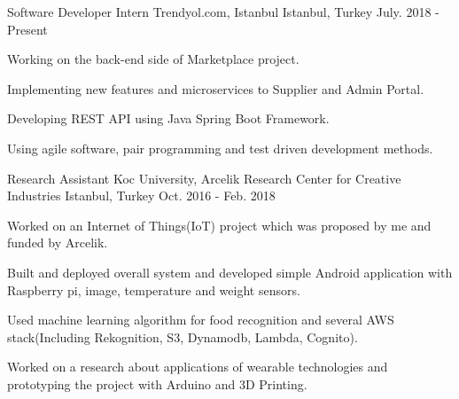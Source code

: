 
\begin{cventries}

  \cventry
   {Software Developer Intern} %
    {Trendyol.com, Istanbul} %
    {Istanbul, Turkey} %
    {July. 2018 - Present} %
    {
      \begin{cvitems} %
        \item {Working on the back-end side of Marketplace project.}  
        \item {Implementing new features and microservices to Supplier and Admin Portal.}
        \item {Developing REST API using Java Spring Boot Framework.}
        \item {Using agile software, pair programming and test driven development methods.}
      \end{cvitems}
    }

  \cventry
    {Research Assistant} %
    {Koc University, Arcelik Research Center for Creative Industries} %
    {Istanbul, Turkey} %
    {Oct. 2016 - Feb. 2018} %
    {
      \begin{cvitems} %
       	\item {Worked on an Internet of Things(IoT) project which was proposed by me and funded by Arcelik.}
       	\item {Built and deployed overall system and developed simple Android application with Raspberry pi, image, temperature and weight sensors.  }
       	\item {Used machine learning algorithm for food recognition and several AWS stack(Including Rekognition, S3, Dynamodb, Lambda, Cognito).} 
         \item {Worked on a research about applications of wearable technologies and prototyping the project with Arduino and 3D Printing.  }
      \end{cvitems}
    }
\begin{comment}
  \cventry
    {Work \& Study} %
    {Koc University, Computer Information Technology Department} %
    {Istanbul, Turkey} %
    {OCt. 2015 - May. 2016} %
    {
      \begin{cvitems} %
        \item {Applied and tested Google Cloud technologies across the campus.}
      \end{cvitems}
    }

\end{comment}
\end{cventries}
